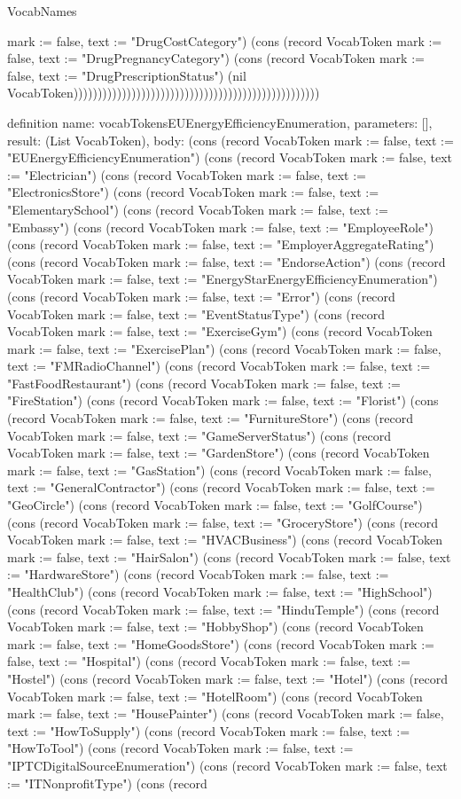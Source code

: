 \begin{lexlean}{VocabNames}
\begin{semanticmodule}
{{mark := false, text := "DrugCostCategory"}) (cons (record VocabToken {mark := false, text := "DrugPregnancyCategory"}) (cons (record VocabToken {mark := false, text := "DrugPrescriptionStatus"}) (nil VocabToken)))))))))))))))))))))))))))))))))))))))))))))))))))
}

definition{
  name: vocabTokensEUEnergyEfficiencyEnumeration,
  parameters: [],
  result: (List VocabToken),
  body: (cons (record VocabToken {mark := false, text := "EUEnergyEfficiencyEnumeration"}) (cons (record VocabToken {mark := false, text := "Electrician"}) (cons (record VocabToken {mark := false, text := "ElectronicsStore"}) (cons (record VocabToken {mark := false, text := "ElementarySchool"}) (cons (record VocabToken {mark := false, text := "Embassy"}) (cons (record VocabToken {mark := false, text := "EmployeeRole"}) (cons (record VocabToken {mark := false, text := "EmployerAggregateRating"}) (cons (record VocabToken {mark := false, text := "EndorseAction"}) (cons (record VocabToken {mark := false, text := "EnergyStarEnergyEfficiencyEnumeration"}) (cons (record VocabToken {mark := false, text := "Error"}) (cons (record VocabToken {mark := false, text := "EventStatusType"}) (cons (record VocabToken {mark := false, text := "ExerciseGym"}) (cons (record VocabToken {mark := false, text := "ExercisePlan"}) (cons (record VocabToken {mark := false, text := "FMRadioChannel"}) (cons (record VocabToken {mark := false, text := "FastFoodRestaurant"}) (cons (record VocabToken {mark := false, text := "FireStation"}) (cons (record VocabToken {mark := false, text := "Florist"}) (cons (record VocabToken {mark := false, text := "FurnitureStore"}) (cons (record VocabToken {mark := false, text := "GameServerStatus"}) (cons (record VocabToken {mark := false, text := "GardenStore"}) (cons (record VocabToken {mark := false, text := "GasStation"}) (cons (record VocabToken {mark := false, text := "GeneralContractor"}) (cons (record VocabToken {mark := false, text := "GeoCircle"}) (cons (record VocabToken {mark := false, text := "GolfCourse"}) (cons (record VocabToken {mark := false, text := "GroceryStore"}) (cons (record VocabToken {mark := false, text := "HVACBusiness"}) (cons (record VocabToken {mark := false, text := "HairSalon"}) (cons (record VocabToken {mark := false, text := "HardwareStore"}) (cons (record VocabToken {mark := false, text := "HealthClub"}) (cons (record VocabToken {mark := false, text := "HighSchool"}) (cons (record VocabToken {mark := false, text := "HinduTemple"}) (cons (record VocabToken {mark := false, text := "HobbyShop"}) (cons (record VocabToken {mark := false, text := "HomeGoodsStore"}) (cons (record VocabToken {mark := false, text := "Hospital"}) (cons (record VocabToken {mark := false, text := "Hostel"}) (cons (record VocabToken {mark := false, text := "Hotel"}) (cons (record VocabToken {mark := false, text := "HotelRoom"}) (cons (record VocabToken {mark := false, text := "HousePainter"}) (cons (record VocabToken {mark := false, text := "HowToSupply"}) (cons (record VocabToken {mark := false, text := "HowToTool"}) (cons (record VocabToken {mark := false, text := "IPTCDigitalSourceEnumeration"}) (cons (record VocabToken {mark := false, text := "ITNonprofitType"}) (cons (record }
\end{semanticmodule}
\end{lexlean}
